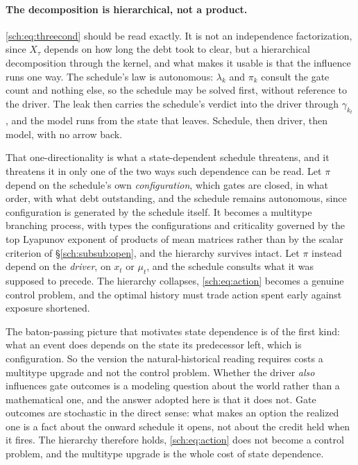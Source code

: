 \paragraph{The decomposition is hierarchical, not a product.}\label{sch:rem:hierarchical}
\eqref{sch:eq:threecond} should be read exactly. It is not an
independence factorization, since $X_\tau$ depends on how long the debt
took to clear, but a hierarchical decomposition through the kernel, and
what makes it usable is that the influence runs one way. The schedule's law is autonomous: $\lambda_k$
and $\pi_k$ consult the gate count and nothing else, so the schedule may
be solved first, without reference to the driver. The leak then carries
the schedule's verdict into the driver through $\gamma_{k_t}$, and the
model runs from the state that leaves. Schedule, then driver, then
model, with no arrow back.

That one-directionality is what a state-dependent schedule threatens,
and it threatens it in only one of the two ways such dependence can be
read. Let $\pi$ depend on the schedule's own \emph{configuration}, which gates are closed, in what order, with what debt outstanding, and the schedule remains autonomous, since configuration is generated by
the schedule itself. It becomes a multitype branching process, with
types the configurations and criticality governed by the top Lyapunov
exponent of products of mean matrices rather than by the scalar
criterion of \S\ref{sch:subsub:open}, and the hierarchy survives intact.
Let $\pi$ instead depend on the \emph{driver}, on $x_t$ or $\mu_t$, and the schedule consults what it was supposed to precede. The
hierarchy collapses, \eqref{sch:eq:action} becomes a genuine control
problem, and the optimal history must trade action spent early against
exposure shortened.

The baton-passing picture that motivates state dependence is of the
first kind: what an event does depends on the state its predecessor
left, which is configuration. So the version the natural-historical
reading requires costs a multitype upgrade and not the control problem.
Whether the driver \emph{also} influences gate outcomes is a modeling
question about the world rather than a mathematical one, and the answer
adopted here is that it does not. Gate outcomes are stochastic in the
direct sense: what makes an option the realized one is a fact about the
onward schedule it opens, not about the credit held when it fires. The
hierarchy therefore holds, \eqref{sch:eq:action} does not become a
control problem, and the multitype upgrade is the whole cost of state
dependence.

